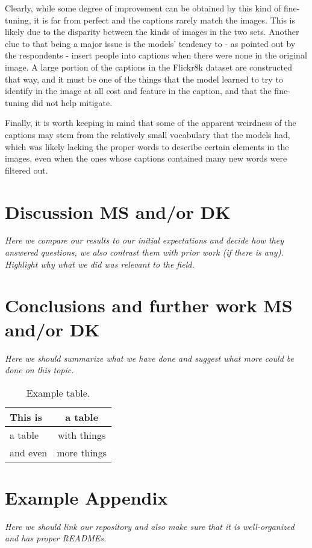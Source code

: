 \documentclass[11pt]{article}
\begin{document}
Clearly, while some degree of improvement can be obtained by this kind of fine-tuning, it is far from perfect and the captions rarely match the images. This is likely due to the disparity between the kinds of images in the two sets. Another clue to that being a major issue is the models' tendency to - as pointed out by the respondents - insert people into captions when there were none in the original image. A large portion of the captions in the Flickr8k dataset are constructed that way, and it must be one of the things that the model learned to try to identify in the image at all cost and feature in the caption, and that the fine-tuning did not help mitigate.

Finally, it is worth keeping in mind that some of the apparent weirdness of the captions may stem from the relatively small vocabulary that the models had, which was likely lacking the proper words to describe certain elements in the images, even when the ones whose captions contained many new words were filtered out. 

\section{Discussion \textbf{MS and/or DK}}

\textit{Here we compare our results to our initial expectations and decide how they answered questions, we also contrast them with prior work (if there is any). Highlight why what we did was relevant to the field.}

\section{Conclusions and further work \textbf{MS and/or DK}}

\textit{Here we should summarize what we have done and suggest what more could be done on this topic.}

\begin{table}
\centering
\begin{tabular}{lc}
\hline
\textbf{This is} & \textbf{a table}\\
\hline
a table & with things \\
and even & more things  \\\hline
\end{tabular}
\caption{Example table.}
\label{tab:accents}
\end{table}



\appendix

\section{Example Appendix}
\label{sec:appendix}

\textit{Here we should link our repository and also make sure that it is well-organized and has proper READMEs.}
\end{document}
